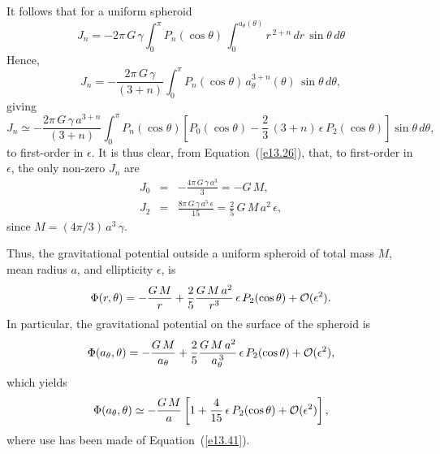 It follows that for a uniform spheroid
\begin{equation}
J_n = - 2\pi\,G\,\gamma\int_0^\pi P_n(\cos\theta)\,\int_0^{a_\theta(\theta)}r^{\,2+n}\,dr\,\sin\theta\,d\theta
\end{equation}
Hence,
\begin{equation}
J_n = -\frac{2\pi\,G\,\gamma}{(3+n)}\int_0^\pi P_n(\cos\theta)\,a_\theta^{3+n}(\theta)\,\sin\theta\,d\theta,
\end{equation}
giving
\begin{equation}
J_n \simeq -\frac{2\pi\,G\,\gamma\,a^{3+n}}{(3+n)}\int_0^\pi P_n(\cos\theta)\left[P_0(\cos\theta)-\frac{2}{3}\,(3+n)\,\epsilon\,P_2(\cos\theta)\right]\sin\theta\,d\theta,
\end{equation}
to first-order in $\epsilon$. It is thus clear, from Equation~(\ref{e13.26}),
that, to first-order in $\epsilon$, the only non-zero $J_n$ are
\begin{eqnarray}
J_0 &=& - \frac{4\pi\,G\,\gamma\,a^3}{3} = - G\,M,\\[0.5ex]
J_2 &=&  \frac{8\pi\,G\,\gamma\,a^5\,\epsilon}{15} = \frac{2}{5}\,G\,M\,a^2\,\epsilon,\label{e13.48}
\end{eqnarray}
since $M = (4\pi/3)\,a^3\,\gamma$. 

Thus, the gravitational potential outside a uniform spheroid of
total mass $M$, mean radius $a$, and ellipticity $\epsilon$, is
\begin{equation}\label{e13.49}
\Phi(r,\theta) = - \frac{G\,M}{r} +\frac{2}{5}\frac{G\,M\,a^2}{r^3}\,\epsilon\,P_2(\cos\theta) + {\cal O}(\epsilon^2).
\end{equation}
In particular,
the gravitational potential on the surface of the spheroid is
\begin{equation}
\Phi(a_\theta, \theta) = - \frac{G\,M}{a_\theta} +\frac{2}{5}\frac{G\,M\,a^2}{a_\theta^{\,3}}\,\epsilon\,P_2(\cos\theta) + {\cal O}(\epsilon^2),
\end{equation}
which yields
\begin{equation}\label{e13.51}
\Phi(a_\theta,\theta) \simeq - \frac{G\,M}{a} \left[1+\frac{4}{15}\,\epsilon\,P_2(\cos\theta) + {\cal O}(\epsilon^2)\right],
\end{equation}
where use has been made of Equation~(\ref{e13.41}).

